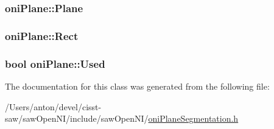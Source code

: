 \subsubsection[{Plane}]{ oni\+Plane\+::\+Plane}\label{classoni_plane_acde480a1ed54a84b6516b80f55149c08}
\hypertarget{classoni_plane_afd6f4fda85393983081d8fc25d3af0d5}{}
\subsubsection[{Rect}]{ oni\+Plane\+::\+Rect}\label{classoni_plane_afd6f4fda85393983081d8fc25d3af0d5}
\hypertarget{classoni_plane_a341b7fd56afc83f1c52a23339d2360af}{}
\subsubsection[{Used}]{\setlength{\rightskip}{0pt plus 5cm}bool oni\+Plane\+::\+Used}\label{classoni_plane_a341b7fd56afc83f1c52a23339d2360af}


The documentation for this class was generated from the following file\+:\begin{DoxyCompactItemize}
\item 
/\+Users/anton/devel/cisst-\/saw/saw\+Open\+N\+I/include/saw\+Open\+N\+I/\hyperlink{oni_plane_segmentation_8h}{oni\+Plane\+Segmentation.\+h}\end{DoxyCompactItemize}

